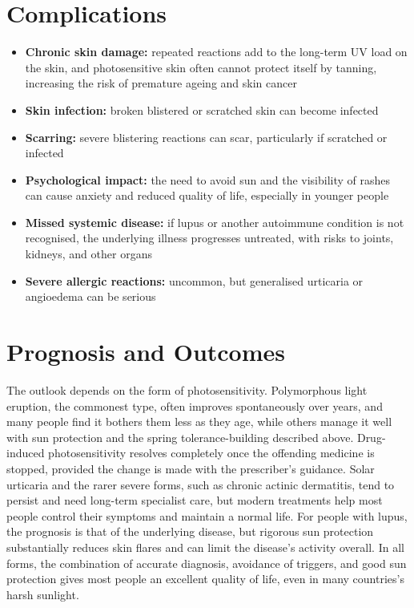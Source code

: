 \section*{Complications}
\begin{itemize}
    \item \textbf{Chronic skin damage:} repeated reactions add to the long-term UV load on the skin, and photosensitive skin often cannot protect itself by tanning, increasing the risk of premature ageing and skin cancer
    \item \textbf{Skin infection:} broken blistered or scratched skin can become infected
    \item \textbf{Scarring:} severe blistering reactions can scar, particularly if scratched or infected
    \item \textbf{Psychological impact:} the need to avoid sun and the visibility of rashes can cause anxiety and reduced quality of life, especially in younger people
    \item \textbf{Missed systemic disease:} if lupus or another autoimmune condition is not recognised, the underlying illness progresses untreated, with risks to joints, kidneys, and other organs
    \item \textbf{Severe allergic reactions:} uncommon, but generalised urticaria or angioedema can be serious
\end{itemize}

\section*{Prognosis and Outcomes}
The outlook depends on the form of photosensitivity. Polymorphous light eruption, the commonest type, often improves spontaneously over years, and many people find it bothers them less as they age, while others manage it well with sun protection and the spring tolerance-building described above. Drug-induced photosensitivity resolves completely once the offending medicine is stopped, provided the change is made with the prescriber's guidance. Solar urticaria and the rarer severe forms, such as chronic actinic dermatitis, tend to persist and need long-term specialist care, but modern treatments help most people control their symptoms and maintain a normal life. For people with lupus, the prognosis is that of the underlying disease, but rigorous sun protection substantially reduces skin flares and can limit the disease's activity overall. In all forms, the combination of accurate diagnosis, avoidance of triggers, and good sun protection gives most people an excellent quality of life, even in many countries's harsh sunlight.

